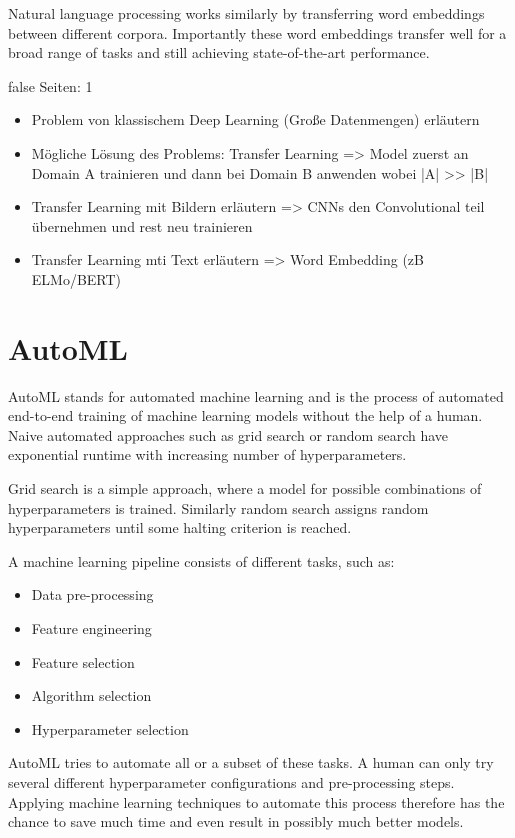 \documentclass[draft,final,oneside]{vutinfth} %
\begin{document}
Natural language processing works similarly by transferring word embeddings between different corpora. Importantly these word embeddings transfer well for a broad range of tasks \cite{elmo} and still achieving state-of-the-art performance. 


\if false
Seiten: 1
\begin{itemize}
\item Problem von klassischem Deep Learning (Große Datenmengen) erläutern
\item Mögliche Lösung des Problems: Transfer Learning => Model zuerst an Domain A trainieren und dann bei Domain B anwenden wobei |A| >> |B|
\item Transfer Learning mit Bildern erläutern => CNNs den Convolutional teil übernehmen und rest neu trainieren
\item Transfer Learning mti Text erläutern => Word Embedding (zB ELMo/BERT)
\end{itemize}
\fi


\section{AutoML} \label{automlbackground}

AutoML stands for automated machine learning and is the process of automated end-to-end training of machine learning models without the help of a human. Naive automated approaches such as grid search or random search have exponential runtime with increasing number of hyperparameters.

Grid search is a simple approach, where a model for possible combinations of hyperparameters is trained. Similarly random search assigns random hyperparameters until some halting criterion is reached.

A machine learning pipeline consists of different tasks, such as:

\begin{itemize}
\item Data pre-processing
\item Feature engineering
\item Feature selection
\item Algorithm selection
\item Hyperparameter selection
\end{itemize}

AutoML tries to automate all or a subset of these tasks. A human can only try several different hyperparameter configurations and pre-processing steps. Applying machine learning techniques to automate this process therefore has the chance to save much time and even result in possibly much better models.
\end{document}
